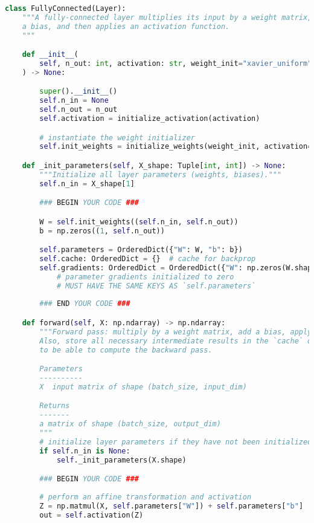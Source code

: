 \begin{lstlisting}[language=Python]
class FullyConnected(Layer):
    """A fully-connected layer multiplies its input by a weight matrix, adds
    a bias, and then applies an activation function.
    """

    def __init__(
        self, n_out: int, activation: str, weight_init="xavier_uniform"
    ) -> None:

        super().__init__()
        self.n_in = None
        self.n_out = n_out
        self.activation = initialize_activation(activation)

        # instantiate the weight initializer
        self.init_weights = initialize_weights(weight_init, activation=activation)

    def _init_parameters(self, X_shape: Tuple[int, int]) -> None:
        """Initialize all layer parameters (weights, biases)."""
        self.n_in = X_shape[1]

        ### BEGIN YOUR CODE ###

        W = self.init_weights((self.n_in, self.n_out))
        b = np.zeros((1, self.n_out))

        self.parameters = OrderedDict({"W": W, "b": b})
        self.cache: OrderedDict = {}  # cache for backprop
        self.gradients: OrderedDict = OrderedDict({"W": np.zeros(W.shape), "b": np.zeros(b.shape)})
            # parameter gradients initialized to zero
            # MUST HAVE THE SAME KEYS AS `self.parameters`
 
        ### END YOUR CODE ###

    def forward(self, X: np.ndarray) -> np.ndarray:
        """Forward pass: multiply by a weight matrix, add a bias, apply activation.
        Also, store all necessary intermediate results in the `cache` dictionary
        to be able to compute the backward pass.

        Parameters
        ----------
        X  input matrix of shape (batch_size, input_dim)

        Returns
        -------
        a matrix of shape (batch_size, output_dim)
        """
        # initialize layer parameters if they have not been initialized
        if self.n_in is None:
            self._init_parameters(X.shape)

        ### BEGIN YOUR CODE ###
        
        # perform an affine transformation and activation
        Z = np.matmul(X, self.parameters["W"]) + self.parameters["b"]
        out = self.activation(Z)
        

\end{lstlisting}
